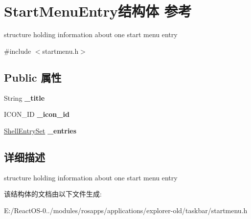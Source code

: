 \hypertarget{struct_start_menu_entry}{}\section{Start\+Menu\+Entry结构体 参考}
\label{struct_start_menu_entry}


structure holding information about one start menu entry  




{\ttfamily \#include $<$startmenu.\+h$>$}

\subsection*{Public 属性}
\begin{DoxyCompactItemize}
\item 
\mbox{\label{struct_start_menu_entry_acb0b291fc307e0516a70645f29588b33}} 
String {\bfseries \+\_\+title}
\item 
\mbox{\label{struct_start_menu_entry_a1270d2df33400c82c04040518399ef9d}} 
I\+C\+O\+N\+\_\+\+ID {\bfseries \+\_\+icon\+\_\+id}
\item 
\mbox{\label{struct_start_menu_entry_a34001b0e1beaa596a49cca51e31d578e}} 
\hyperlink{classset}{Shell\+Entry\+Set} {\bfseries \+\_\+entries}
\end{DoxyCompactItemize}


\subsection{详细描述}
structure holding information about one start menu entry 

该结构体的文档由以下文件生成\+:\begin{DoxyCompactItemize}
\item 
E\+:/\+React\+O\+S-\/0../modules/rosapps/applications/explorer-\/old/taskbar/startmenu.\+h\end{DoxyCompactItemize}
